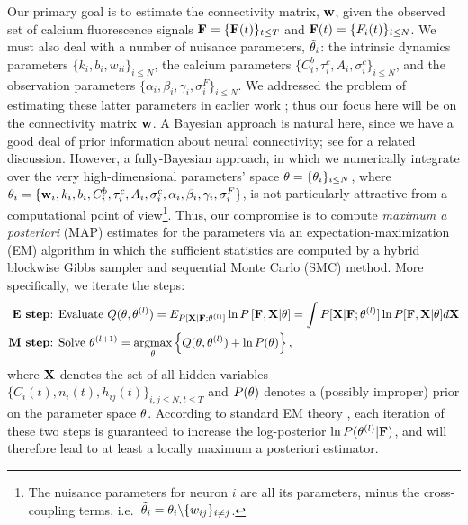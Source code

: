Our primary goal is to estimate the connectivity matrix, $\mathbf{w}$, given the observed set of calcium fluorescence signals ${\bf F}=\{{\bf F}(t)\}_{t\leq T}$ and ${\bf F}(t)=\{F_i(t)\}_{i\leq N}$. We must also deal with a number of nuisance parameters, $\tilde{\mathbf{\theta}}_i$: the intrinsic dynamics parameters $\{k_i, b_i, w_{ii}\}_{i\leq N}$, the calcium parameters $\{C^b_i, \tau^c_i, A_i, \sigma^c_i\}_{i\leq N}$, and the observation parameters $\{\alpha_i, \beta_i, \gamma_i, \sigma^F_i\}_{i\leq N}$. We addressed the problem of estimating these latter parameters in earlier work \cite{Vogelstein2009}; thus our focus here will be on the connectivity matrix $\mathbf{w}$. A Bayesian approach is natural here, since we have a good deal of prior information about neural connectivity; see \cite{Rigat06} for a related discussion. However, a fully-Bayesian approach, in which we numerically integrate over the very high-dimensional parameters' space $\mathbf{\theta}= \{\mathbf{\theta}_i\}_{i\leq N}$, where $\mathbf{\theta}_i=\{\mathbf{w}_i, k_i, b_i, C^b_i, \tau^c_i, A_i, \sigma^c_i, \alpha_i, \beta_i, \gamma_i, \sigma^F_i\}$, is not particularly attractive from a computational point of view\footnote{The nuisance parameters for neuron $i$ are all its parameters, minus the cross-coupling terms, i.e.\ $\tilde{\mathbf{\theta}}_i =\mathbf{\theta}_i \backslash \{w_{ij}\}_{i\neq j}$.}. Thus, our compromise is to compute \emph{maximum a posteriori} (MAP) estimates for the parameters via an expectation-maximization (EM) algorithm in which the sufficient statistics are computed by a hybrid blockwise Gibbs sampler and sequential Monte Carlo (SMC) method. More specifically, we iterate the steps:
\begin{align*}
\textbf{E step} &\text{: Evaluate } Q(\mathbf{\theta},\mathbf{\theta}^{(l)}) = E_{P[{\bf X} |
{\bf F}; \mathbf{\theta}^{(l)}]} \ln P \left[ {\bf F}, {\bf X} | \mathbf{\theta} \right] = \int P[{\bf X} |
{\bf F}; \mathbf{\theta}^{(l)}] \ln P[{\bf F}, {\bf X} | \mathbf{\theta}] d {\bf X} \\ \textbf{M step}
&\text{: Solve } \mathbf{\theta}^{(l+1)} = \operatorname*{argmax}_{\mathbf{\theta}} \left\{
Q(\mathbf{\theta},\mathbf{\theta}^{(l)}) + \ln P(\mathbf{\theta}) \right\},
\end{align*}
where ${\bf X}$ denotes the set of all hidden variables $\{ C_i(t), n_i(t), h_{ij}(t) \}_{i,j \leq N, t \leq T}$ and $P(\mathbf{\theta})$ denotes a (possibly improper) prior on the parameter space $\mathbf{\theta}$. According to standard EM theory \cite{DLR77,McLachlanKrishnan96}, each iteration of these two steps is guaranteed to increase the log-posterior $\ln P(\mathbf{\theta}^{(l)} | {\bf F})$, and will therefore lead to at least a locally maximum a posteriori estimator.

